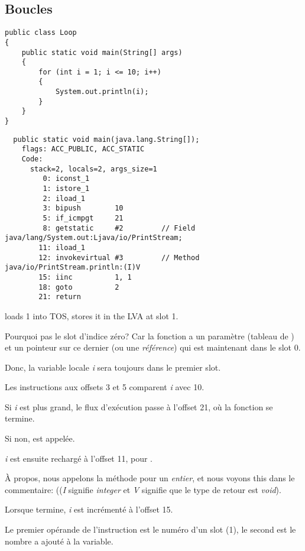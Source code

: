 \subsection{Boucles}

\begin{lstlisting}[style=customjava]
public class Loop
{
	public static void main(String[] args)
	{
		for (int i = 1; i <= 10; i++)
		{
			System.out.println(i);
		}
	}
}
\end{lstlisting}

\begin{lstlisting}
  public static void main(java.lang.String[]);
    flags: ACC_PUBLIC, ACC_STATIC
    Code:
      stack=2, locals=2, args_size=1
         0: iconst_1
         1: istore_1
         2: iload_1
         3: bipush        10
         5: if_icmpgt     21
         8: getstatic     #2         // Field java/lang/System.out:Ljava/io/PrintStream;
        11: iload_1
        12: invokevirtual #3         // Method java/io/PrintStream.println:(I)V
        15: iinc          1, 1
        18: goto          2
        21: return
\end{lstlisting}

 loads 1 into \ac{TOS},  stores it in the \ac{LVA} at slot 1.

Pourquoi pas le slot d'indice zéro?
Car la fonction \main a un paramètre (tableau de ) et un pointeur sur
ce dernier (ou une \emph{référence}) qui est maintenant dans le slot 0.


Donc, la variable locale \emph{i} sera toujours dans le premier slot.


Les instructions aux offsets 3 et 5 comparent \emph{i} avec 10.

Si \emph{i} est plus grand, le flux d'exécution passe à l'offset 21, où la fonction
se termine.

Si non,  est appelée.

\emph{i} est ensuite rechargé à l'offset 11, pour .

À propos, nous appelons la méthode  pour un \emph{entier}, et nous voyons
this dans le commentaire:  ((\emph{I} signifie \emph{integer} et \emph{V}
signifie que le type de retour est \emph{void}).


Lorsque  termine, \emph{i} est incrémenté à l'offset 15.

Le premier opérande de l'instruction est le numéro d'un slot (1), le second est le
nombre a ajouté à la variable.




